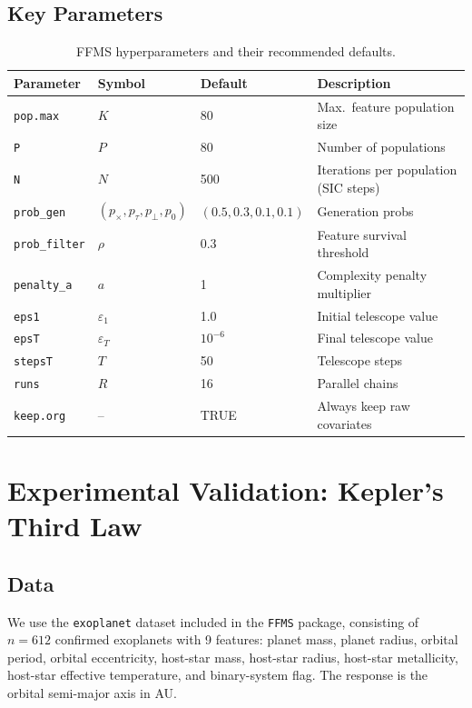 \documentclass[12pt,a4paper]{article}
\begin{document}
\subsection{Key Parameters}

\begin{table}[H]
  \centering
  \caption{FFMS hyperparameters and their recommended defaults.}
  \label{tab:params}
  \begin{tabular}{llll}
    \toprule
    Parameter & Symbol & Default & Description \\
    \midrule
    \texttt{pop.max} & $K$ & 80 & Max.\ feature population size \\
    \texttt{P} & $P$ & 80 & Number of populations \\
    \texttt{N} & $N$ & 500 & Iterations per population (SIC steps) \\
    \texttt{prob\_gen} & $(p_\times,p_\tau,p_\perp,p_0)$ & $(0.5,0.3,0.1,0.1)$ & Generation probs \\
    \texttt{prob\_filter} & $\rho$ & 0.3 & Feature survival threshold \\
    \texttt{penalty\_a} & $a$ & 1 & Complexity penalty multiplier \\
    \texttt{eps1} & $\varepsilon_1$ & 1.0 & Initial telescope value \\
    \texttt{epsT} & $\varepsilon_T$ & $10^{-6}$ & Final telescope value \\
    \texttt{stepsT} & $T$ & 50 & Telescope steps \\
    \texttt{runs} & $R$ & 16 & Parallel chains \\
    \texttt{keep.org} & -- & TRUE & Always keep raw covariates \\
    \bottomrule
  \end{tabular}
\end{table}

\section{Experimental Validation: Kepler's Third Law}
\label{sec:experiments}

\subsection{Data}

We use the \texttt{exoplanet} dataset included in the \texttt{FFMS} package,
consisting of $n=612$ confirmed exoplanets with 9 features:
planet mass, planet radius, orbital period, orbital eccentricity,
host-star mass, host-star radius, host-star metallicity,
host-star effective temperature, and binary-system flag.
The response is the orbital semi-major axis in AU.
\end{document}
